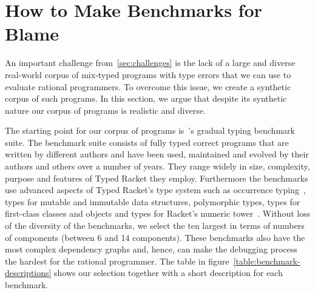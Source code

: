 \section{How to Make Benchmarks for Blame} \label{sec:mutate}

An important challenge from~\ref{sec:challenges} is the lack of a large and diverse real-world
 corpus of  mix-typed programs with type errors that we can use to
 evaluate rational programmers. To overcome this issue, 
we create a synthetic corpus of such programs. In this section, we argue
that despite its synthetic nature our corpus of programs is realistic 
and diverse.

The starting point for our corpus of programs
is~\citet{gtnffvf-jfp-2019}'s gradual typing benchmark suite. The
benchmark suite consists of fully typed correct programs that are written by different authors
and have been used, maintained and evolved by their authors and others over a
number of years.  They range widely in size, complexity, purpose and
features of Typed Racket they employ.  Furthermore the benchmarks use advanced aspects 
of Typed Racket's type system such as occurrence
typing~\cite{tf-icfp-2010}, types for mutable and immutable data
structures, polymorphic types, types for first-class classes and objects and types for
Racket's numeric tower~\cite{stathff-padl-12}. Without loss of the diversity of the benchmarks,
we select the ten largest in terms of numbers of components (between 6 and 14 components).
These benchmarks also have the most complex dependency graphs and, hence, 
can make the debugging process the hardest for the rational programmer. 
The table in figure~\ref{table:benchmark-descriptions} shows our selection
together with a short description for each benchmark.  



